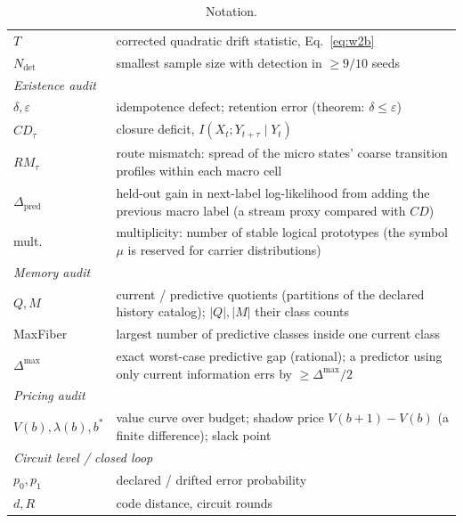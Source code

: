 \begin{table}[H]
\begin{tabular}{l p{10.5cm}}
$T$ & corrected quadratic drift statistic, Eq.~\eqref{eq:w2b} \\
$N_{\mathrm{det}}$ & smallest sample size with detection in $\ge 9/10$ seeds \\
\midrule
\multicolumn{2}{l}{\emph{Existence audit}} \\
$\delta, \varepsilon$ & idempotence defect; retention error (theorem: $\delta \le \varepsilon$) \\
$CD_\tau$ & closure deficit, $I(X_t; Y_{t+\tau} \mid Y_t)$ \\
$RM_\tau$ & route mismatch: spread of the micro states' coarse transition profiles within each macro cell \\
$\Delta_{\mathrm{pred}}$ & held-out gain in next-label log-likelihood from adding the previous macro label (a stream proxy compared with $CD$) \\
mult.\ & multiplicity: number of stable logical prototypes (the symbol $\mu$ is reserved for carrier distributions) \\
\midrule
\multicolumn{2}{l}{\emph{Memory audit}} \\
$Q, M$ & current / predictive quotients (partitions of the declared history catalog); $|Q|, |M|$ their class counts \\
MaxFiber & largest number of predictive classes inside one current class \\
$\Delta^{\max}$ & exact worst-case predictive gap (rational); a predictor using only current information errs by $\ge \Delta^{\max}/2$ \\
\midrule
\multicolumn{2}{l}{\emph{Pricing audit}} \\
$V(b), \lambda(b), b^{*}$ & value curve over budget; shadow price $V(b{+}1)-V(b)$ (a finite difference); slack point \\
\midrule
\multicolumn{2}{l}{\emph{Circuit level / closed loop}} \\
$p_0, p_1$ & declared / drifted error probability \\
$d, R$ & code distance, circuit rounds \\
\bottomrule
\end{tabular}
\caption{Notation.}
\label{tab:notation}
\end{table}

